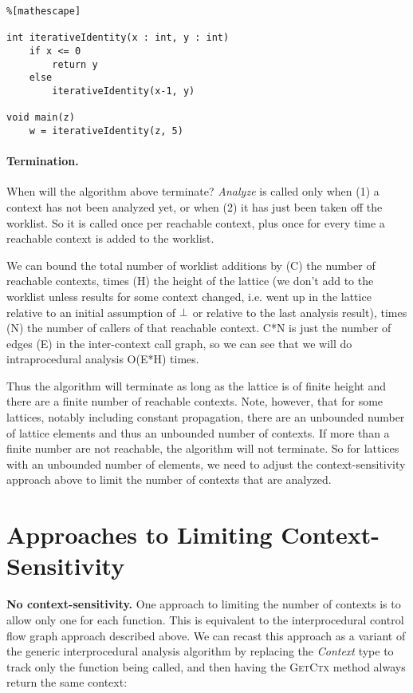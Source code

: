 \documentclass[11pt]{article}
\begin{document}
\begin{lstlisting}%[mathescape]

int iterativeIdentity(x : int, y : int)
    if x <= 0
        return y
    else
        iterativeIdentity(x-1, y)
        
void main(z)
    w = iterativeIdentity(z, 5)
\end{lstlisting}

\paragraph{Termination.} When will the algorithm above terminate?  
\textit{Analyze} is called only when (1) a context has not been analyzed
yet, or when (2) it has just been taken off the worklist. So it is called once per reachable context,
plus once for every time a reachable context is added to the worklist.

We can bound the total number of worklist additions by (C) the number of reachable contexts,
times (H) the height of the lattice (we don’t add to the worklist unless results for some context
changed, i.e. went up in the lattice relative to an initial assumption of $\bot$ or relative to the last
analysis result), times (N) the number of callers of that reachable context. C*N is just the number
of edges (E) in the inter-context call graph, so we can see that we will do intraprocedural analysis
O(E*H) times.

Thus the algorithm will terminate as long as the lattice is of finite height and there are a finite
number of reachable contexts. Note, however, that for some lattices, notably including constant
propagation, there are an unbounded number of lattice elements and thus an unbounded number
of contexts. If more than a finite number are not reachable, the algorithm will not terminate.
So for lattices with an unbounded number of elements, we need to adjust the context-sensitivity
approach above to limit the number of contexts that are analyzed.

\section{Approaches to Limiting Context-Sensitivity}

\textbf{No context-sensitivity.} One approach to limiting the number of contexts is to allow only one for
each function. This is equivalent to the interprocedural control flow graph approach described
above. We can recast this approach as a variant of the generic interprocedural analysis algorithm
by replacing the \textit{Context} type to track only the function being called, and then having the \textsc{GetCtx}
method always return the same context:
\end{document}
